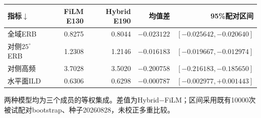\begin{table}[htbp]
\centering\small
\setlength{\tabcolsep}{3pt}
\begin{tabular}{lrrrr}
\toprule
指标$\downarrow$ & FiLM E130 & Hybrid E190 & 均值差 & 95\%配对区间\\
\midrule
全域ERB & 0.8275 & 0.8044 & $-0.023122$ & $[-0.025642,-0.020640]$ \\
对侧$25^\circ$ ERB & 1.2308 & 1.2146 & $-0.016183$ & $[-0.019667,-0.012974]$ \\
对侧高频 & 3.7028 & 3.5020 & $-0.200758$ & $[-0.216183,-0.185650]$ \\
水平面ILD & 0.6306 & 0.6298 & $-0.000787$ & $[-0.002977,+0.001443]$ \\
\bottomrule
\end{tabular}
\par\smallskip
\parbox{\linewidth}{\footnotesize 两种模型均为三个成员的等权集成。差值为Hybrid$-$FiLM；区间采用既有10000次被试配对bootstrap、种子20260828，未校正多重比较。}
\end{table}
